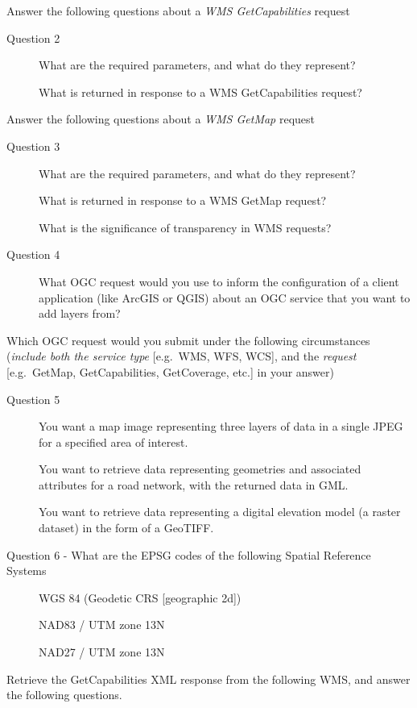 \documentclass[]{book}
\begin{document}
Answer the following questions about a \emph{WMS GetCapabilities}
request

\begin{description}
\item[Question 2]
What are the required parameters, and what do they represent?

What is returned in response to a WMS GetCapabilities request?
\end{description}

Answer the following questions about a \emph{WMS GetMap} request

\begin{description}
\item[Question 3]
What are the required parameters, and what do they represent?

What is returned in response to a WMS GetMap request?

What is the significance of transparency in WMS requests?
\item[Question 4]
What OGC request would you use to inform the configuration of a client
application (like ArcGIS or QGIS) about an OGC service that you want to
add layers from?
\end{description}

Which OGC request would you submit under the following circumstances
(\emph{include both the service type} {[}e.g.~WMS, WFS, WCS{]}, and the
\emph{request} {[}e.g.~GetMap, GetCapabilities, GetCoverage, etc.{]} in
your answer)

\begin{description}
\item[Question 5]
You want a map image representing three layers of data in a single JPEG
for a specified area of interest.

You want to retrieve data representing geometries and associated
attributes for a road network, with the returned data in GML.

You want to retrieve data representing a digital elevation model (a
raster dataset) in the form of a GeoTIFF.
\item[Question 6 - What are the EPSG codes of the following Spatial
Reference Systems]
WGS 84 (Geodetic CRS {[}geographic 2d{]})

NAD83 / UTM zone 13N

NAD27 / UTM zone 13N
\end{description}

Retrieve the GetCapabilities XML response from the following WMS, and
answer the following questions.
\end{document}
